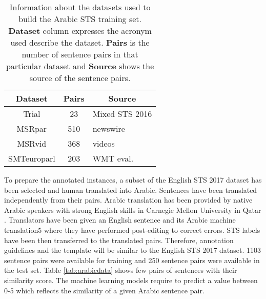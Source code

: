 \begin{enumerate}
\begin{table}[ht!]
	\centering
	\begin{tabular}{c|c|l}
		\hline
		\multicolumn{1}{c|}{\textbf{Dataset}} & 
		\multicolumn{1}{c|}{\textbf{Pairs}} & 
		\multicolumn{1}{c}{\textbf{Source}} \\
		\hline
		Trial & 23 & Mixed STS 2016 \\
		MSRpar  & 510 & newswire \\
		MSRvid  & 368 & videos \\
		SMTeuroparl  & 203 & WMT eval. \\
		\hline
	\end{tabular}
	\caption[Information about Arabic STS training set]{Information about the datasets used to build the Arabic STS training set. \textbf{Dataset} column expresses the acronym used describe the dataset. \textbf{Pairs} is the number of sentence pairs in that particular dataset and \textbf{Source} shows the source of the sentence pairs. }
	\label{tab:arabicdata_info}
\end{table}  

To prepare the annotated instances, a subset of the English STS 2017 dataset has been selected and human translated into Arabic. Sentences have been translated independently from their pairs. Arabic translation has been provided by native Arabic speakers with strong English skills in Carnegie Mellon University in Qatar . Translators have been given an English sentence and its Arabic machine translation5 where they have performed post-editing to correct errors.  STS labels have been then transferred to the translated pairs. Therefore, annotation guidelines and the template will be similar to the English STS 2017 dataset. 1103 sentence pairs were available for training and 250 sentence pairs were available in the test set. Table \ref{tab:arabicdata} shows few pairs of sentences with their similarity score. The machine learning models require to predict a value between 0-5 which reflects the similarity of a given Arabic sentence pair. 


\end{enumerate}
